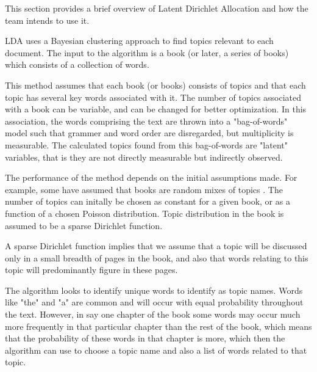 
This section provides a brief overview of Latent Dirichlet Allocation and
how the team intends to use it.

LDA uses a Bayesian clustering approach to find topics relevant
to each document. \cite{RefWorks:doc:5a721fb5e4b0d609eec83aa1} The input to
the algorithm is a book (or later, a series of books) which consists of
a collection of words. 
\par This method assumes that each book (or books) consists of topics and that each topic has several key words associated with it. The number of topics associated with a book can be variable, and can be changed for better optimization. In this association, the words comprising the text are thrown into a "bag-of-words" model such that grammer and word order are disregarded, but multiplicity is measurable. The calculated topics found from this bag-of-words are "latent" variables, that is they are not directly measurable but indirectly observed.  
\par The performance of the method depends on the initial assumptions made. For example, some have assumed that books are random mixes of topics \cite{RefWorks:doc:5a721e4ae4b095066af57410}. The number of topics can initally be chosen as constant for a given book, or as a function of a chosen Poisson distribution. \cite{RefWorks:doc:5a721e4ae4b095066af57410} Topic distribution in the book is assumed to be a sparse Dirichlet function.
\par A sparse Dirichlet function implies that we assume that a topic will be discussed only in a small breadth of pages in the book, and also that words relating to this topic will predominantly figure in these pages.
\par The algorithm looks to identify unique words to identify as topic
names. Words like "the" and "a" are common and will occur with equal
probability throughout the text. However, in say one chapter of the
book some words may occur much more frequently in that particular
chapter than the rest of the book, which means that the probability of
these words in that chapter is more, which then the algorithm can use
to choose a topic name and also a list of words related to that topic.
